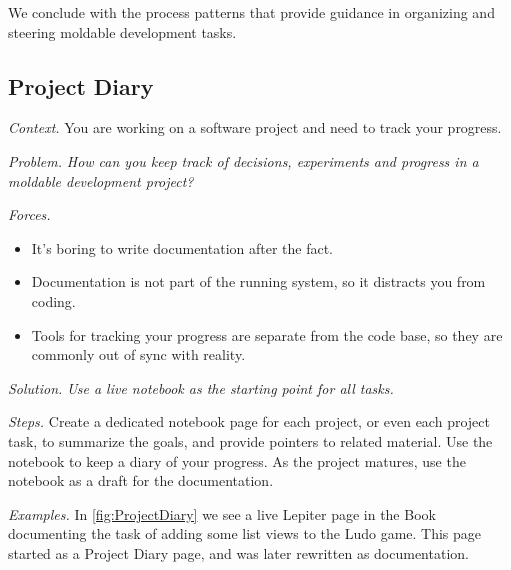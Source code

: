 \documentclass[acmsmall,screen,authorversion,nonacm]{acmart} %
\newcommand\eog[1]{\nbc{Edward}{#1}{purple}}
\newcommand\cp[1]{\nbe{Cesare}{#1}{olive}} %
\newcommand{\GT}{\lst{GT}\xspace} %
\newcommand{\pattern}[2]{\needlines{10}
\subsection*{#1}\label{pat:#2}}
\newcommand{\patsec}[1]{\noindent\textit{#1.}\xspace}
\begin{document}
We conclude with the process patterns that provide guidance in organizing and steering moldable development tasks.

\pattern{Project Diary}{ProjectDiary}

\patsec{Context}
You are working on a software project and need to track your progress.

\patsec{Problem}
\emph{How can you keep track of decisions, experiments and progress in a moldable development project?}

\patsec{Forces}
\begin{itemize}[---]
\item It's boring to write documentation after the fact.
\item Documentation is not part of the running system, so it distracts you from coding.
\item Tools for tracking your progress are separate from the code base, so they are commonly out of sync with reality.
\end{itemize}

\patsec{Solution}
\emph{Use a live notebook 
as the starting point for all tasks.}

\patsec{Steps}
Create a dedicated notebook page for each project, or even each project task, to summarize the goals, and provide pointers to related material.
Use the notebook to keep a diary of your progress.
As the project matures, use the notebook as a draft 
for the documentation.

\patsec{Examples}
In \autoref{fig:ProjectDiary} we see a live Lepiter page in the \GT Book
documenting the task of adding some list views to the Ludo game.
This page started as a Project Diary page, and was later rewritten as documentation.

\end{document}
